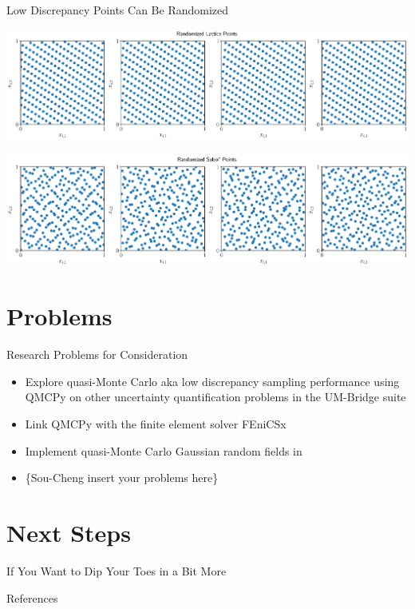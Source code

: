\documentclass[10pt,compress,xcolor={usenames,dvipsnames},aspectratio=169]{beamer}
\begin{document}
\begin{frame}{Low Discrepancy Points Can Be Randomized}
	\vspace{-3.2ex}

	\includegraphics[width=\textwidth]{latticeptsrand.eps}

	\vspace{-4.3ex}

	\includegraphics[width=\textwidth]{sobolptsrand.eps}


\end{frame}

\section{Problems}

\begin{frame}{Research Problems for Consideration}
    \begin{itemize}
        \item Explore quasi-Monte Carlo aka low discrepancy sampling performance using QMCPy on other uncertainty quantification problems in the UM-Bridge suite 

        \item Link QMCPy with the finite element solver FEniCSx

        \item Implement quasi-Monte Carlo Gaussian random fields in 

        \item \{Sou-Cheng insert your problems here\}
        
    \end{itemize}
\end{frame}


\section{Next Steps}

\begin{frame}{If You Want to Dip Your Toes in a Bit More}
    
\end{frame}


\begin{frame}[allowframebreaks]{References}
	\printbibliography
\end{frame}
\end{document}
